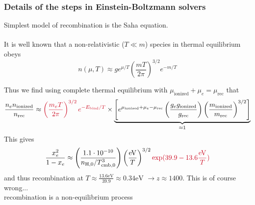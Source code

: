\begin{frame}[fragile]
	\frametitle{Details of the steps in Einstein-Boltzmann solvers}
	
	Simplest model of {\Red recombination} is the {\Red Saha equation}.\\ \mbox{}\\ 
	
	It is well known that a non-relativistic ($T \ll m$) species in thermal equilibrium obeys
	\begin{equation}
		n(\mu,T) \approx g e^{\mu/T} \left(\frac{m T}{2 \pi}\right)^{3/2} e^{-m/T}
	\end{equation}
	
	Thus we find using {\Red complete thermal equilibrium} with $\mu_\mathrm{ionized} + \mu_e = \mu_\mathrm{rec}$ that
	\begin{equation*}
		\frac{n_e n_\mathrm{ionized}}{n_\mathrm{rec}} \approx {\Red \left(\frac{m_e T}{2\pi}\right)^{3/2} e^{-E_\mathrm{bind}/T}} \times \underbrace{\left[ e^{\mu_\mathrm{ionized} + \mu_e - \mu_\mathrm{rec}} \left(\frac{g_e g_\mathrm{ionized}}{g_\mathrm{rec}}\right) \left(\frac{m_\mathrm{ionized}}{m_\mathrm{rec}}\right)^{3/2}\right]}_{\approx 1}
	\end{equation*}
	\vspace*{-2\baselineskip}
	This gives
	\begin{equation}
		\frac{x_e^2}{1-x_e} \approx \left(\frac{1.1 \cdot 10^{-10}}{n_\mathrm{H,0} /T_\mathrm{cmb,0}^3}\right) \left(\frac{\mathrm{eV}}{T}\right)^{3/2} {\Red \exp(39.9 - 13.6 \frac{\mathrm{eV}}{T})}
	\end{equation}
	and thus recombination at $T \approx \frac{13.6\mathrm{eV}}{39.9} \approx 0.34\mathrm{eV}$ $\to z \approx 1400$. \pause This is of course wrong...\\ \pause
	{\Red recombination is a non-equilibrium process}
\end{frame}


